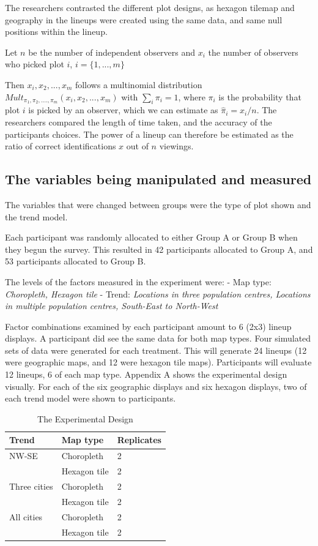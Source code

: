 \documentclass[conference,final,]{IEEEtran}
\begin{document}
The researchers contrasted the different plot designs, as hexagon
tilemap and geography in the lineups were created using the same data,
and same null positions within the lineup.

Let \(n\) be the number of independent observers and \(x_i\) the number
of observers who picked plot \(i\), \(i = \{1,...,m\}\)

Then \(x_i, x_2, ..., x_m\) follows a multinomial
distribution\(Mult_{\pi_1, \pi_2, ...., \pi_m}(x_i, x_2, ..., x_m)\)
with \(\sum_i \pi_i = 1\), where \(\pi_i\) is the probability that plot
\(i\) is picked by an observer, which we can estimate as
\(\hat{\pi}_i = x_i/n\). The researchers compared the length of time
taken, and the accuracy of the participants choices. The power of a
lineup can therefore be estimated as the ratio of correct
identifications \(x\) out of \(n\) viewings.

\hypertarget{the-variables-being-manipulated-and-measured}{%
\subsection{The variables being manipulated and
measured}\label{the-variables-being-manipulated-and-measured}}

The variables that were changed between groups were the type of plot
shown and the trend model.

Each participant was randomly allocated to either Group A or Group B
when they begun the survey. This resulted in 42 participants allocated
to Group A, and 53 participants allocated to Group B.

The levels of the factors measured in the experiment were: - Map type:
\emph{Choropleth, Hexagon tile} - Trend: \emph{Locations in three
population centres, Locations in multiple population centres, South-East
to North-West}

Factor combinations examined by each participant amount to 6 (2x3)
lineup displays. A participant did see the same data for both map types.
Four simulated sets of data were generated for each treatment. This will
generate 24 lineups (12 were geographic maps, and 12 were hexagon tile
maps). Participants will evaluate 12 lineups, 6 of each map type.
Appendix A shows the experimental design visually. For each of the six
geographic displays and six hexagon displays, two of each trend model
were shown to participants.

\begin{table}[]
\caption{The Experimental Design}
\label{tab:my-table}
\begin{tabular}{|l|l|l|}
\hline
Trend & Map type & Replicates \\ \hline
NW-SE & Choropleth & 2 \\ \hline
 & Hexagon tile & 2 \\ \hline
Three cities & Choropleth & 2 \\ \hline
 & Hexagon tile & 2 \\ \hline
All cities & Choropleth & 2 \\ \hline
 & Hexagon tile & 2 \\ \hline
\end{tabular}
\end{table}
\end{document}

